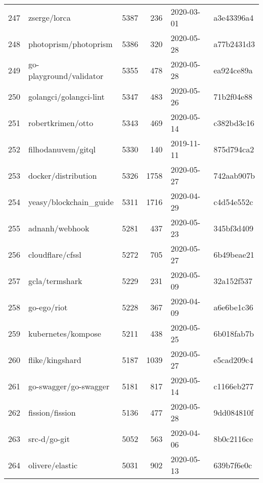 \begin{longtable}{llrrll}
    247 &                                       zserge/lorca &   5387 &    236 & 2020-03-01 &  a3e43396a4 \\
    248 &                              photoprism/photoprism &   5386 &    320 & 2020-05-28 &  a77b2431d3 \\
    249 &                            go-playground/validator &   5355 &    478 & 2020-05-28 &  ea924ce89a \\
    250 &                             golangci/golangci-lint &   5347 &    483 & 2020-05-26 &  71b2f04e88 \\
    251 &                                  robertkrimen/otto &   5343 &    469 & 2020-05-14 &  c382bd3c16 \\
    252 &                                 filhodanuvem/gitql &   5330 &    140 & 2019-11-11 &  875d794ca2 \\
    253 &                                docker/distribution &   5326 &   1758 & 2020-05-27 &  742aab907b \\
    254 &                             yeasy/blockchain\_guide &   5311 &   1716 & 2020-04-29 &  c4d54e552c \\
    255 &                                     adnanh/webhook &   5281 &    437 & 2020-05-23 &  345bf3d409 \\
    256 &                                   cloudflare/cfssl &   5272 &    705 & 2020-05-27 &  6b49beae21 \\
    257 &                                     gcla/termshark &   5229 &    231 & 2020-05-09 &  32a152f537 \\
    258 &                                        go-ego/riot &   5228 &    367 & 2020-04-09 &  a6e6be1c36 \\
    259 &                                 kubernetes/kompose &   5211 &    438 & 2020-05-25 &  6b018fab7b \\
    260 &                                    flike/kingshard &   5187 &   1039 & 2020-05-27 &  e5cad209c4 \\
    261 &                              go-swagger/go-swagger &   5181 &    817 & 2020-05-14 &  c1166eb277 \\
    262 &                                    fission/fission &   5136 &    477 & 2020-05-28 &  9dd084810f \\
    263 &                                       src-d/go-git &   5052 &    563 & 2020-04-06 &  8b0c2116ce \\
    264 &                                    olivere/elastic &   5031 &    902 & 2020-05-13 &  639b7f6e0c \\

\end{longtable}
